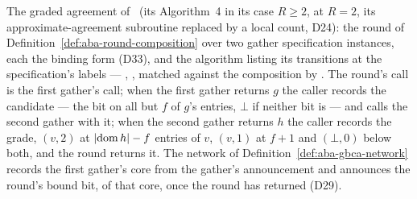 \begin{definition}
  \label{def:aba-round-over-gather-specifications}
  \leanok
  The graded agreement of~\cite{AFW25} (its Algorithm~4 in its case $R \ge 2$, at $R = 2$, its approximate-agreement subroutine replaced by a local count, D24): the round of Definition~\ref{def:aba-round-composition} over two gather specification instances, each the binding form (D33), and the algorithm listing its transitions at the specification's labels --- , , matched against the composition by .
  The round's call is the first gather's call; when the first gather returns $g$ the caller records the candidate --- the bit on all but $f$ of $g$'s entries, $\bot$ if neither bit is --- and calls the second gather with it; when the second gather returns $h$ the caller records the grade, $(v, 2)$ at $|{\rm dom}\, h| - f$ entries of $v$, $(v, 1)$ at $f{+}1$ and $(\bot, 0)$ below both, and the round returns it.
  The network of Definition~\ref{def:aba-gbca-network} records the first gather's core from the gather's announcement and announces the round's bound bit,  of that core, once the round has returned (D29).
\end{definition}
